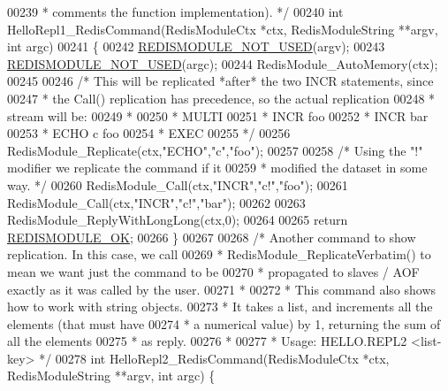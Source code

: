 \begin{DoxyCode}
00239 \textcolor{comment}{ * comments the function implementation). */}
00240 \textcolor{keywordtype}{int} HelloRepl1\_RedisCommand(RedisModuleCtx *ctx, RedisModuleString **argv, \textcolor{keywordtype}{int} argc)
00241 \{
00242     \hyperlink{redismodule_8h_a46d75d81383a00bd6b941af6cadf64c2}{REDISMODULE\_NOT\_USED}(argv);
00243     \hyperlink{redismodule_8h_a46d75d81383a00bd6b941af6cadf64c2}{REDISMODULE\_NOT\_USED}(argc);
00244     RedisModule\_AutoMemory(ctx);
00245 
00246     \textcolor{comment}{/* This will be replicated *after* the two INCR statements, since}
00247 \textcolor{comment}{     * the Call() replication has precedence, so the actual replication}
00248 \textcolor{comment}{     * stream will be:}
00249 \textcolor{comment}{     *}
00250 \textcolor{comment}{     * MULTI}
00251 \textcolor{comment}{     * INCR foo}
00252 \textcolor{comment}{     * INCR bar}
00253 \textcolor{comment}{     * ECHO c foo}
00254 \textcolor{comment}{     * EXEC}
00255 \textcolor{comment}{     */}
00256     RedisModule\_Replicate(ctx,\textcolor{stringliteral}{"ECHO"},\textcolor{stringliteral}{"c"},\textcolor{stringliteral}{"foo"});
00257 
00258     \textcolor{comment}{/* Using the "!" modifier we replicate the command if it}
00259 \textcolor{comment}{     * modified the dataset in some way. */}
00260     RedisModule\_Call(ctx,\textcolor{stringliteral}{"INCR"},\textcolor{stringliteral}{"c!"},\textcolor{stringliteral}{"foo"});
00261     RedisModule\_Call(ctx,\textcolor{stringliteral}{"INCR"},\textcolor{stringliteral}{"c!"},\textcolor{stringliteral}{"bar"});
00262 
00263     RedisModule\_ReplyWithLongLong(ctx,0);
00264 
00265     \textcolor{keywordflow}{return} \hyperlink{redismodule_8h_a1bc5bfd69abcd378ff52c640adc5418d}{REDISMODULE\_OK};
00266 \}
00267 
00268 \textcolor{comment}{/* Another command to show replication. In this case, we call}
00269 \textcolor{comment}{ * RedisModule\_ReplicateVerbatim() to mean we want just the command to be}
00270 \textcolor{comment}{ * propagated to slaves / AOF exactly as it was called by the user.}
00271 \textcolor{comment}{ *}
00272 \textcolor{comment}{ * This command also shows how to work with string objects.}
00273 \textcolor{comment}{ * It takes a list, and increments all the elements (that must have}
00274 \textcolor{comment}{ * a numerical value) by 1, returning the sum of all the elements}
00275 \textcolor{comment}{ * as reply.}
00276 \textcolor{comment}{ *}
00277 \textcolor{comment}{ * Usage: HELLO.REPL2 <list-key> */}
00278 \textcolor{keywordtype}{int} HelloRepl2\_RedisCommand(RedisModuleCtx *ctx, RedisModuleString **argv, \textcolor{keywordtype}{int} argc) \{

\end{DoxyCode}

